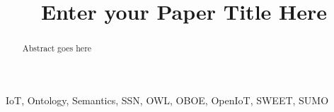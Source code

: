 \documentclass[conference]{IEEEtran}
\begin{document}
	\title{Enter your Paper Title Here}
	\author
	{
	}
	\maketitle
	\begin{abstract}
		Abstract goes here
	\end{abstract}
	\begin {IEEEkeywords}
		IoT, Ontology, Semantics,  SSN, OWL, OBOE, OpenIoT, SWEET, SUMO
	\end{IEEEkeywords}
	
	
	
	
%
%
%
%
%
%
%
%
%
%
%
%
%
%
%
%
%
	
	
\end{document}
